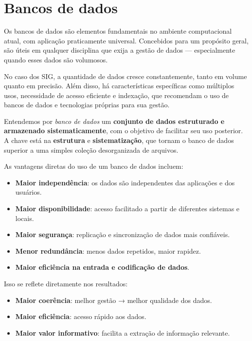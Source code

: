 \chapter{Bancos de dados}

\pagestyle{fancy}

Os bancos de dados são elementos fundamentais no ambiente computacional atual, com aplicação praticamente universal. Concebidos para um propósito geral, são úteis em qualquer disciplina que exija a gestão de dados — especialmente quando esses dados são volumosos.

No caso dos SIG, a quantidade de dados cresce constantemente, tanto em volume quanto em precisão. Além disso, há características específicas como múltiplos usos, necessidade de acesso eficiente e indexação, que recomendam o uso de bancos de dados e tecnologias próprias para sua gestão.

Entendemos por \emph{banco de dados} um \textbf{conjunto de dados estruturado e armazenado sistematicamente}, com o objetivo de facilitar seu uso posterior. A chave está na \textbf{estrutura} e \textbf{sistematização}, que tornam o banco de dados superior a uma simples coleção desorganizada de arquivos.

As vantagens diretas do uso de um banco de dados incluem:

\begin{itemize}
	\item \textbf{Maior independência}: os dados são independentes das aplicações e dos usuários.
	\item \textbf{Maior disponibilidade}: acesso facilitado a partir de diferentes sistemas e locais.
	\item \textbf{Maior segurança}: replicação e sincronização de dados mais confiáveis.
	\item \textbf{Menor redundância}: menos dados repetidos, maior rapidez.
	\item \textbf{Maior eficiência na entrada e codificação de dados}.
\end{itemize}

Isso se reflete diretamente nos resultados:

\begin{itemize}
	\item \textbf{Maior coerência}: melhor gestão → melhor qualidade dos dados.
	\item \textbf{Maior eficiência}: acesso rápido aos dados.
	\item \textbf{Maior valor informativo}: facilita a extração de informação relevante.
\end{itemize}

